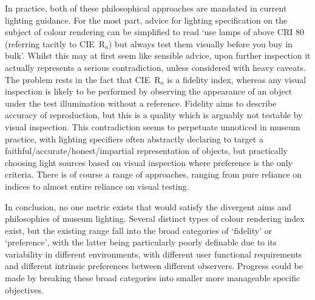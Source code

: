 In practice, both of these philosophical approaches are mandated in current lighting guidance. For the most part, advice for lighting specification on the subject of colour rendering can be simplified to read `use lamps of above \gls{CRI} 80 (referring tacitly to \gls{CIE}~R$_a$) but always test them visually before you buy in bulk'. Whilst this may at first seem like sensible advice, upon further inspection it actually represents a serious contradiction, unless considered with heavy caveats. The problem rests in the fact that \gls{CIE}~R$_a$ is a fidelity index, whereas any visual inspection is likely to be performed by observing the appearance of an object under the test illumination without a reference. Fidelity aims to describe accuracy of reproduction, but this is a quality which is arguably not testable by visual inspection. This contradiction seems to perpetuate unnoticed in museum practice, with lighting specifiers often abstractly declaring to target a faithful/accurate/honest/impartial representation of objects, but practically choosing light sources based on visual inspection where preference is the only criteria. There is of course a range of approaches, ranging from pure reliance on indices to almost entire reliance on visual testing.

In conclusion, no one metric exists that would satisfy the divergent aims and philosophies of museum lighting. Several distinct types of colour rendering index exist, but the existing range fall into the broad categories of `fidelity' or `preference', with the latter being particularly poorly definable due to its variability in different environments, with different user functional requirements and different intrinsic preferences between different observers. Progress could be made by breaking these broad categories into smaller more manageable specific objectives.










